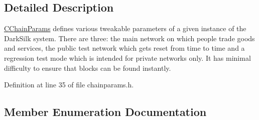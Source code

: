 \subsection{Detailed Description}
\hyperlink{class_c_chain_params}{C\+Chain\+Params} defines various tweakable parameters of a given instance of the Dark\+Silk system. There are three\+: the main network on which people trade goods and services, the public test network which gets reset from time to time and a regression test mode which is intended for private networks only. It has minimal difficulty to ensure that blocks can be found instantly. 

Definition at line 35 of file chainparams.\+h.



\subsection{Member Enumeration Documentation}
\hypertarget{class_c_chain_params_aa294058ec2e3586bd8d03d6c39667058}{}
